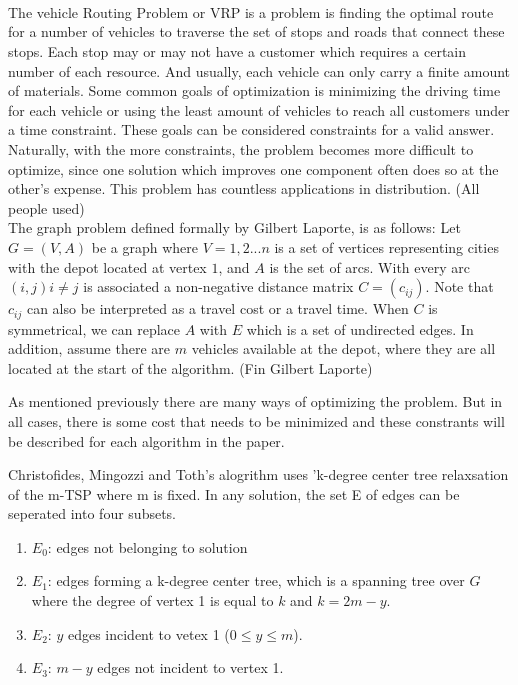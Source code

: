 \documentclass[letterpaper,11pt]{article}
\begin{document}
\\
\\
\\

The vehicle Routing Problem or VRP is a problem is finding the optimal route for a number of vehicles to traverse the set of stops and roads that connect these stops. Each stop may or may not have a customer which requires a certain number of each resource. And usually, each vehicle can only carry a finite amount of materials. Some common goals of optimization is minimizing the driving time for each vehicle or using the least amount of vehicles to reach all customers under a time constraint. These goals can be considered constraints for a valid answer. Naturally, with the more constraints, the problem becomes more difficult to optimize, since one solution which improves one component often does so at the other’s expense.  This problem has countless applications in distribution. (All people used)\\

The graph problem defined formally by Gilbert Laporte, is as follows: Let $G=(V,A)$ be a graph where $V={1,2...n}$ is a set of vertices representing cities with the depot located at vertex $1$, and $A$ is the set of arcs. With every arc $(i,j) i \neq j$ is associated a non-negative distance matrix $C = (c_{ij})$. Note that $c_{ij}$ can also be interpreted as a travel cost or a travel time. When $C$ is symmetrical, we can replace $A$ with $E$ which is a set of undirected edges.  In addition, assume there are $m$ vehicles available at the depot, where they are all located at the start of the algorithm. (Fin Gilbert Laporte)
 
As mentioned previously there are many ways of optimizing the problem. But in all cases, there is some cost that needs to be minimized and these constrants will be described for each algorithm in the paper.

Christofides, Mingozzi and Toth's alogrithm uses 'k-degree center tree relaxsation of the m-TSP where m is fixed. In any solution, the set E of edges can be seperated into four subsets. 
\begin{enumerate}
\item $E_0$: edges not belonging to solution
\item $E_1$: edges forming a k-degree center tree, which is a spanning tree over $G$ where the degree of vertex 1 is equal to $k$ and $k = 2m-y$.
\item $E_2$: $y$ edges incident to vetex 1 ($0\leq y \leq m$).
\item $E_3$: $m-y$ edges not incident to vertex 1.
\end{enumerate}
\end{document}
